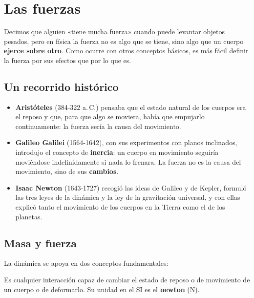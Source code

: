 \section{Las fuerzas}\label{sec:ud10-fuerzas}

Decimos que alguien «tiene mucha fuerza» cuando puede levantar objetos pesados, pero en física la fuerza no es algo que se tiene,
sino algo que un cuerpo \textbf{ejerce sobre otro}. Como ocurre con otros conceptos básicos, es más fácil definir la fuerza por sus
efectos que por lo que es.

\subsection{Un recorrido histórico}

\begin{itemize}
    \item \textbf{Aristóteles} (384-322 a.\,C.) pensaba que el estado natural de los cuerpos era el reposo y que, para que algo se
    moviera, había que empujarlo continuamente: la fuerza sería la causa del movimiento.
    \item \textbf{Galileo Galilei} (1564-1642), con sus experimentos con planos inclinados, introdujo el concepto de \textbf{inercia}:
    un cuerpo en movimiento seguiría moviéndose indefinidamente si nada lo frenara. La fuerza no es la causa del movimiento, sino de
    sus \textbf{cambios}.
    \item \textbf{Isaac Newton} (1643-1727) recogió las ideas de Galileo y de Kepler, formuló las tres leyes de la dinámica y la ley
    de la gravitación universal, y con ellas explicó tanto el movimiento de los cuerpos en la Tierra como el de los planetas.
\end{itemize}

\subsection{Masa y fuerza}

La dinámica se apoya en dos conceptos fundamentales:

\begin{definition}[Fuerza]
    Es cualquier interacción capaz de cambiar el estado de reposo o de movimiento de un cuerpo o de deformarlo. Su unidad en el SI es
    el \textbf{newton} (\unit{\newton}).
\end{definition}


